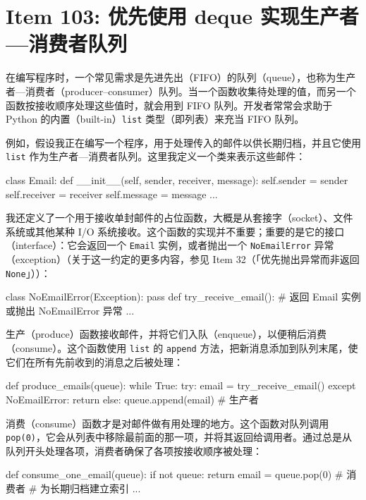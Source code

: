 \section{Item 103: 优先使用 deque 实现生产者—消费者队列}

在编写程序时，一个常见需求是先进先出（FIFO）的队列（queue），也称为生产者—消费者（producer–consumer）队列。当一个函数收集待处理的值，而另一个函数按接收顺序处理这些值时，就会用到 FIFO 队列。开发者常常会求助于 Python 的内置（built-in）\texttt{list} 类型（即列表）来充当 FIFO 队列。

例如，假设我正在编写一个程序，用于处理传入的邮件以供长期归档，并且它使用 \texttt{list} 作为生产者—消费者队列。这里我定义一个类来表示这些邮件：

\begin{codebox}[python]
class Email:
    def __init__(self, sender, receiver, message):
        self.sender = sender
        self.receiver = receiver
        self.message = message
    ...
\end{codebox}

我还定义了一个用于接收单封邮件的占位函数，大概是从套接字（socket）、文件系统或其他某种 I/O 系统接收。这个函数的实现并不重要；重要的是它的接口（interface）：它会返回一个 \texttt{Email} 实例，或者抛出一个 \texttt{NoEmailError} 异常（exception）（关于这一约定的更多内容，参见 Item 32（「优先抛出异常而非返回 \texttt{None}」））：

\begin{codebox}[python]
class NoEmailError(Exception):
    pass
def try_receive_email():
    # 返回 Email 实例或抛出 NoEmailError 异常
    ...
\end{codebox}

生产（produce）函数接收邮件，并将它们入队（enqueue），以便稍后消费（consume）。这个函数使用 \texttt{list} 的 \texttt{append} 方法，把新消息添加到队列末尾，使它们在所有先前收到的消息之后被处理：

\begin{codebox}[python]
def produce_emails(queue):
    while True:
        try:
            email = try_receive_email()
        except NoEmailError:
            return
        else:
            queue.append(email)  # 生产者
\end{codebox}

消费（consume）函数才是对邮件做有用处理的地方。这个函数对队列调用 \texttt{pop(0)}，它会从列表中移除最前面的那一项，并将其返回给调用者。通过总是从队列开头处理各项，消费者确保了各项按接收顺序被处理：

\begin{codebox}[python]
def consume_one_email(queue):
    if not queue:
        return
    email = queue.pop(0)  # 消费者
    # 为长期归档建立索引
    ...
\end{codebox}

